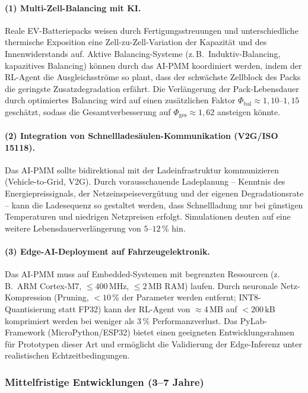 ﻿\documentclass[12pt,a4paper]{article}
\begin{document}
	\paragraph{(1) Multi-Zell-Balancing mit KI.}
	Reale EV-Batteriepacks weisen durch Fertigungsstreuungen und unterschiedliche
	thermische Exposition eine Zell-zu-Zell-Variation der Kapazität und des
	Innenwiderstands auf. Aktive Balancing-Systeme (z.\,B.\ Induktiv-Balancing,
	kapazitives Balancing) können durch das AI-PMM koordiniert werden, indem
	der RL-Agent die Ausgleichsströme so plant, dass der schwächste Zellblock
	des Packs die geringste Zusatzdegradation erfährt. Die Verlängerung der
	Pack-Lebensdauer durch optimiertes Balancing wird auf einen zusätzlichen
	Faktor $\Phi_\mathrm{bal} \approx 1{,}10\text{--}1{,}15$ geschätzt,
	sodass die Gesamtverbesserung auf $\Phi_\mathrm{ges} \approx 1{,}62$
	ansteigen könnte.
	
	\paragraph{(2) Integration von Schnellladesäulen-Kommunikation (V2G/ISO 15118).}
	Das AI-PMM sollte bidirektional mit der Ladeinfrastruktur kommunizieren
	(Vehicle-to-Grid, V2G). Durch vorausschauende Ladeplanung -- Kenntnis des
	Energiepreissignals, der Netzeinspeisevergütung und der eigenen Degradationsrate
	-- kann die Ladesequenz so gestaltet werden, dass Schnellladung nur bei
	günstigen Temperaturen und niedrigen Netzpreisen erfolgt. Simulationen
	deuten auf eine weitere Lebensdauerverlängerung von $5\text{--}12\,\%$ hin.
	
	\paragraph{(3) Edge-AI-Deployment auf Fahrzeugelektronik.}
	Das AI-PMM muss auf Embed\-ded-Systemen mit begrenzten Ressourcen
	(z.\,B.\ ARM Cortex-M7, $\leq 400\,\mathrm{MHz}$, $\leq 2\,\mathrm{MB}$ RAM)
	laufen. Durch neuronale Netz-Kompression (Pruning, $< 10\,\%$ der Parameter
	werden entfernt; INT8-Quantisierung statt FP32) kann der RL-Agent von
	$\approx 4\,\mathrm{MB}$ auf $< 200\,\mathrm{kB}$ komprimiert werden bei
	weniger als $3\,\%$ Performanzverlust. Das PyLab-Framework (MicroPython/ESP32)
	bietet einen geeigneten Entwicklungsrahmen für Prototypen dieser Art und
	ermöglicht die Validierung der Edge-Inferenz unter realistischen
	Echtzeitbedingungen.
	
	\subsubsection{Mittelfristige Entwicklungen (3--7 Jahre)}
	
\end{document}
